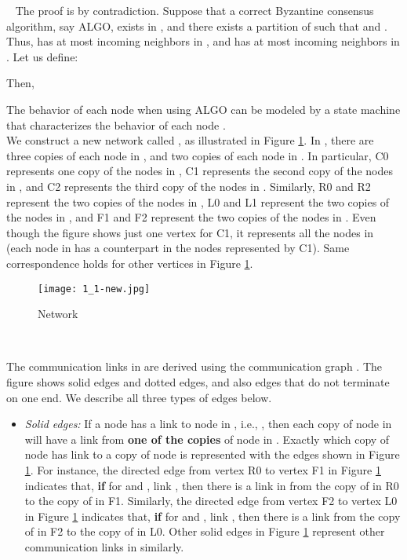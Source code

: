 \documentclass[letterpaper, 11pt]{article}
\newenvironment{proof}{\noindent {\bf Proof:}~}{\hspace*{\fill}}
\begin{document}
\begin{proof}
The proof is by contradiction.
Suppose that a correct Byzantine consensus algorithm, say ALGO, exists in , and there exists a partition  of  such that  and . Thus,  has at most  incoming neighbors in ,
and  has at most  incoming neighbors in .
Let us define:

Then,



The behavior of each node  when
using ALGO can be modeled by a state machine
that characterizes the behavior of each node . \\

We construct a new network called , as illustrated in Figure \ref{sm_1-1}.
In , there are three copies of each node in ,
and two copies of each node in .
In particular, C0 represents one copy of the nodes in ,
C1 represents the second copy of the nodes in ,
and 
C2 represents the third copy of the nodes in .
Similarly, R0 and R2 represent the two copies of the nodes in ,
L0 and L1 represent the two copies of the nodes in , and
F1 and F2 represent the two copies of the nodes in .
Even though the figure shows just one vertex for C1, it represents
all the nodes in  (each node in  has a counterpart in the nodes
represented by C1). Same correspondence holds for other vertices
in Figure \ref{sm_1-1}.





\begin{figure}[p]
\centering
\texttt{[image: 1\_1-new.jpg]}
\caption{Network }
\label{sm_1-1}
\end{figure}

~



The communication links in  are derived using the communication
graph . The figure shows solid edges and dotted edges,
and also edges that do not terminate on one end.
We describe all three types of edges below.
\begin{itemize}
\item {\em Solid edges:}
If a node  has a link to node 
in , i.e., ,
then each copy of node  in  will have a link from
{\bf one of the copies} of node  in .
Exactly which copy of node  has link to a copy of
node  is represented with the edges shown in 
Figure \ref{sm_1-1}.
For instance,
the directed edge from vertex R0 to vertex F1 in Figure \ref{sm_1-1} indicates
that, {\bf if} for  and , link ,
then there is a link in  from the copy of  in R0 to
the copy of  in F1.
Similarly,
the directed edge from vertex F2 to vertex L0 in Figure \ref{sm_1-1} indicates
that, {\bf if} for  and , link ,
then there is a link from the copy of  in F2 to the copy of  in L0.
Other solid edges in Figure \ref{sm_1-1} represent other communication
links in  similarly.


\end{itemize}
\end{proof}
\end{document}
